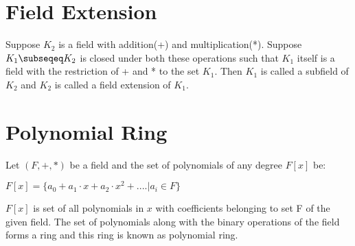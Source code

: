 \documentclass[11pt]{article}
\begin{document}

\section{Field Extension}
Suppose $K_2$ is a field with addition(+) and multiplication(*). Suppose $K_1 \subseqeq K_2$ is closed under both these operations such that $K_1$ itself is a field with the restriction of + and * to the set $K_1$. Then $K_1$ is called a subfield of $K_2$ and $K_2$ is called a field extension of $K_1$.

\section{Polynomial Ring}
Let $(F, +, *)$ be a field and the set of polynomials of any degree $F[x]$ be:
\begin{center}
    $F[x] = \{a_0 + a_1\cdot x + a_2 \cdot x^2 +.... | a_i \in F\}$
\end{center}
$F[x]$ is set of all polynomials in $x$ with coefficients belonging to set F of the given field. The set of polynomials along with the binary operations of the field forms a ring and this ring is known as polynomial ring.
\end{document}
